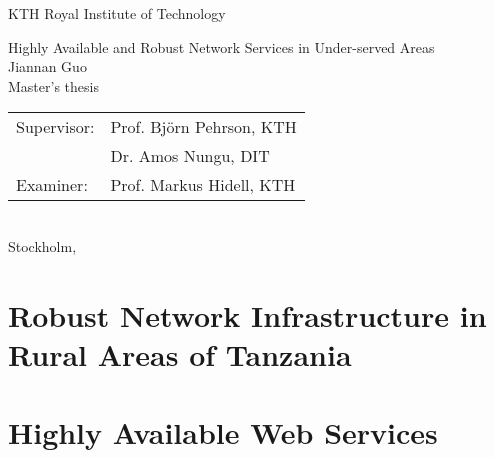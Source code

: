\documentclass[a4paper,11pt]{report}
\author{Jiannan Guo}
\begin{document}
\begin{titlepage}
\thispagestyle{empty}

\begin{center}
  \vspace{0.5cm}
  \Large{\sc KTH Royal Institute of Technology}\\
  \vspace{3cm}

  \vspace{0.5cm}
  \Large{Highly Available and Robust Network Services in Under-served Areas}\\
  \vspace{2cm}  
  \large{\sc Jiannan Guo}\\
  \vspace{3cm}
  Master's thesis\\
  \vspace{0.5cm}
  \begin{tabular}{ll} 
    Supervisor: & Prof. Bj\"{o}rn Pehrson, KTH\\
    & Dr. Amos Nungu, DIT\\		
	Examiner:  & Prof. Markus Hidell, KTH\\ 
  \end{tabular}
  \vspace{1cm}
  \\Stockholm, \\
\end{center} 

\end{titlepage}

\pagestyle{plain}
%

\cleardoublepage
{}
\pagestyle{fancy}

\part{Robust Network Infrastructure in Rural Areas of Tanzania}





\part{Highly Available Web Services}





\cleardoublepage
{}
{}



%
\end{document}
